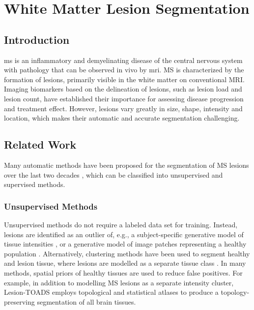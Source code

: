 \chapter{White Matter Lesion Segmentation}
\label{sec:segmentation}

\section{Introduction}

\Gls{ms} is an inflammatory and demyelinating disease of the central nervous
system with pathology that can be observed in vivo by \gls{mri}.
MS is characterized by the formation of lesions, primarily visible in the white
matter on conventional MRI. Imaging biomarkers based on the delineation of
lesions, such as lesion load and lesion count, have established their importance
for assessing disease progression and treatment effect. However, lesions vary
greatly in size, shape, intensity and location, which makes their automatic and
accurate segmentation challenging.

\section[Related work]{Related Work}

Many automatic methods have been proposed for the segmentation of MS
\mbox{lesions} over the last two decades \citep{garcia2013}, which can be
classified into unsupervised and supervised methods.

\subsection[Unsupervised methods]{Unsupervised Methods}

Unsupervised methods do not require a labeled data set for training. Instead,
lesions are identified as an outlier of, e.g., a subject-specific generative
model of tissue intensities
\citep{vanleemput2001,tomas2015,schmidt2012automated,roura2015}, or a generative
model of image patches representing a healthy population \citep{weiss2013}.
Alternatively, clustering methods have been used to segment healthy and lesion
tissue, where lesions are modelled as a separate tissue class
\citep{shiee2010topology,sudre2015}. In many methods, spatial priors of healthy
tissues are used to reduce false positives. For example, in addition to
modelling MS lesions as a separate intensity cluster, Lesion-TOADS
\citep{shiee2010topology} employs topological and statistical atlases to produce
a topology-preserving segmentation of all brain tissues.

